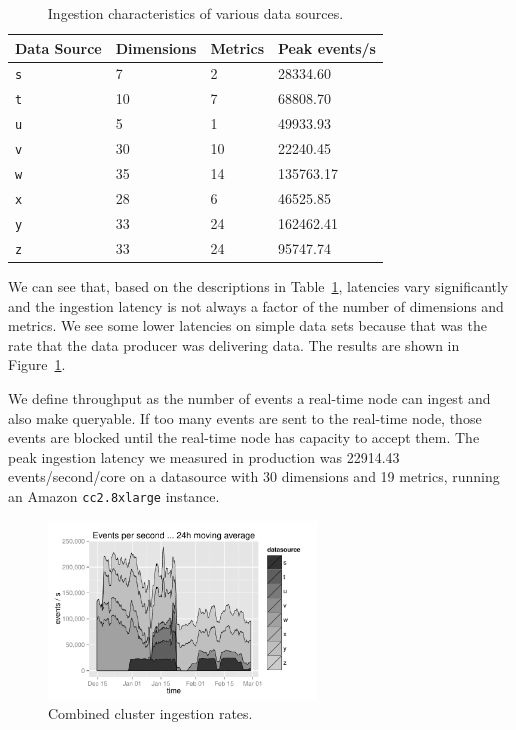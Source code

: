 \documentclass{acm_proc_article-sp}
\begin{document}
\begin{table}
  \centering
  \label{tab:ingest_datasources}
  \begin{tabular}{| l | l | l | l |}
    \hline
    \scriptsize\textbf{Data Source} & \scriptsize\textbf{Dimensions} & \scriptsize\textbf{Metrics} & \scriptsize\textbf{Peak events/s} \\ \hline
    \texttt{s} & 7 & 2 & 28334.60 \\ \hline
    \texttt{t} & 10 & 7 & 68808.70 \\ \hline
    \texttt{u} & 5 & 1 & 49933.93 \\ \hline
    \texttt{v} & 30 & 10 & 22240.45 \\ \hline
    \texttt{w} & 35 & 14 & 135763.17 \\ \hline
    \texttt{x} & 28 & 6 & 46525.85 \\ \hline
    \texttt{y} & 33 & 24 & 162462.41 \\ \hline
    \texttt{z} & 33 & 24 & 95747.74 \\ \hline
  \end{tabular}
  \caption{Ingestion characteristics of various data sources.}
\end{table}

We can see that, based on the descriptions in
Table~\ref{tab:ingest_datasources}, latencies vary significantly and the
ingestion latency is not always a factor of the number of dimensions and
metrics. We see some lower latencies on simple data sets because that was the
rate that the data producer was delivering data. The results are shown in
Figure~\ref{fig:ingestion_rate}.

We define throughput as the number of events a
real-time node can ingest and also make queryable. If too many events are sent
to the real-time node, those events are blocked until the real-time node has
capacity to accept them. The peak ingestion latency we measured in production
was 22914.43 events/second/core on a datasource with 30 dimensions and 19 metrics,
running an Amazon \texttt{cc2.8xlarge} instance.

\begin{figure}
\centering
\includegraphics[width = 2.8in]{ingestion_rate}
\caption{Combined cluster ingestion rates.}
\label{fig:ingestion_rate}
\end{figure}
\end{document}
